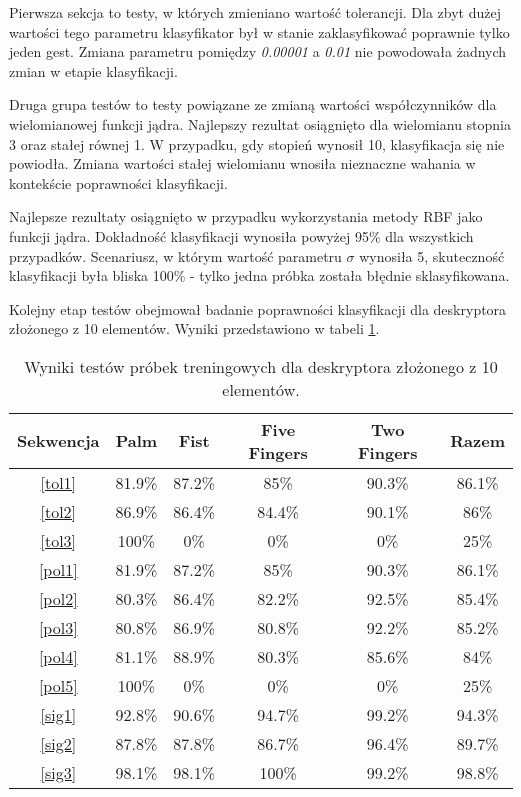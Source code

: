 Pierwsza sekcja to testy, w których zmieniano wartość tolerancji. Dla zbyt dużej wartości tego parametru klasyfikator był w stanie zaklasyfikować poprawnie tylko jeden gest. Zmiana parametru pomiędzy \textit{0.00001} a \textit{0.01} nie powodowała żadnych zmian w etapie klasyfikacji.    

Druga grupa testów to testy powiązane ze zmianą wartości współczynników dla wielomianowej funkcji jądra. Najlepszy rezultat osiągnięto dla wielomianu stopnia 3 oraz stałej równej 1. W przypadku, gdy stopień wynosił 10, klasyfikacja się nie powiodła. Zmiana wartości stałej wielomianu wnosiła nieznaczne wahania w kontekście poprawności klasyfikacji.

Najlepsze rezultaty osiągnięto w przypadku wykorzystania metody RBF jako funkcji jądra. Dokładność klasyfikacji wynosiła powyżej 95\% dla wszystkich przypadków. Scenariusz, w którym wartość parametru $\sigma$ wynosiła 5, skuteczność klasyfikacji była bliska 100\% - tylko jedna próbka została błędnie sklasyfikowana.

Kolejny etap testów obejmował badanie poprawności klasyfikacji dla deskryptora złożonego z 10 elementów. Wyniki przedstawiono w tabeli \ref{tab: train10}.
\begin{table} [h!]
	\centering
	\begin{tabular}{|c|c|c|c|c|c|}
		\hline
		\textbf{Sekwencja} 	& \textbf{Palm} & \textbf{Fist} & \textbf{Five Fingers} & \textbf{Two Fingers} & \textbf{Razem} \\ \hline
		\ref{tol1} 	& 81.9\% 		& 87.2\%		& 85\%		& 90.3\% 	& 86.1\% \\ \hline
		\ref{tol2} 	& 86.9\% 		& 86.4\%		& 84.4\%	& 90.1\% 	& 86\% \\ \hline
		\ref{tol3}	& 100\%			& 0\%			& 0\%		& 0\% 		& 25\% \\ \hline \hline
		\ref{pol1} 	& 81.9\% 		& 87.2\%		& 85\%		& 90.3\% 	& 86.1\% \\ \hline
		\ref{pol2} 	& 80.3\% 		& 86.4\%		& 82.2\%	& 92.5\% 	& 85.4\% \\ \hline
		\ref{pol3}	& 80.8\%		& 86.9\%		& 80.8\%	& 92.2\% 	& 85.2\% \\ \hline
		\ref{pol4}	& 81.1\%		& 88.9\%		& 80.3\%	& 85.6\% 	& 84\% \\ \hline
		\ref{pol5}	& 100\%			& 0\%			& 0\%		& 0\% 		& 25\% \\ \hline \hline
		\ref{sig1}	& 92.8\% 		& 90.6\%		& 94.7\%	& 99.2\% 	& 94.3\% \\ \hline
		\ref{sig2}	& 87.8\% 		& 87.8\%		& 86.7\%	& 96.4\% 	& 89.7\% \\ \hline
		\ref{sig3}	& 98.1\%		& 98.1\%		& 100\%		& 99.2\% 	& 98.8\% \\ \hline
	\end{tabular}
	\caption{Wyniki testów próbek treningowych dla deskryptora złożonego z 10 elementów.}
	\label{tab: train10}
\end{table}

